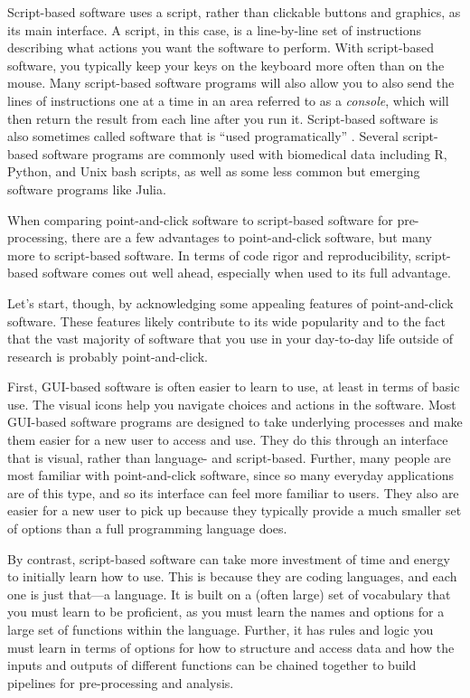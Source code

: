 \documentclass[]{tufte-book}
\begin{document}
Script-based software uses a script, rather than clickable buttons and graphics,
as its main interface. A script, in this case, is a line-by-line set of
instructions describing what actions you want the software to perform. With
script-based software, you typically keep your keys on the keyboard more often
than on the mouse. Many script-based software programs will also allow you to
also send the lines of instructions one at a time in an area referred to as a
\emph{console}, which will then return the result from each line after you run it.
Script-based software is also sometimes called software that is ``used
programatically'' \citep{perkel2018future}. Several script-based software programs are
commonly used with biomedical data including R, Python, and Unix bash scripts,
as well as some less common but emerging software programs like Julia.

When comparing point-and-click software to script-based software for
pre-processing, there are a few advantages to point-and-click software, but
many more to script-based software. In terms of code rigor and reproducibility,
script-based software comes out well ahead, especially when used to its
full advantage.

Let's start, though, by acknowledging some appealing features of point-and-click
software. These features likely contribute to its wide popularity and to the
fact that the vast majority of software that you use in your day-to-day life
outside of research is probably point-and-click.

First, GUI-based software is often easier to learn to use, at least in terms of
basic use. The visual icons help you navigate choices and actions in the
software. Most GUI-based software programs are designed to take underlying
processes and make them easier for a new user to access and use. They do this
through an interface that is visual, rather than language- and script-based.
Further, many people are most familiar with point-and-click software, since so
many everyday applications are of this type, and so its interface can feel more
familiar to users. They also are easier for a new user to pick up because they
typically provide a much smaller set of options than a full programming language
does.

By contrast, script-based software can take more investment of time and energy
to initially learn how to use. This is because they are coding languages, and
each one is just that---a language. It is built on a (often large) set of
vocabulary that you must learn to be proficient, as you must learn the names and
options for a large set of functions within the language. Further, it has rules
and logic you must learn in terms of options for how to structure and access
data and how the inputs and outputs of different functions can be chained
together to build pipelines for pre-processing and analysis.
\end{document}
